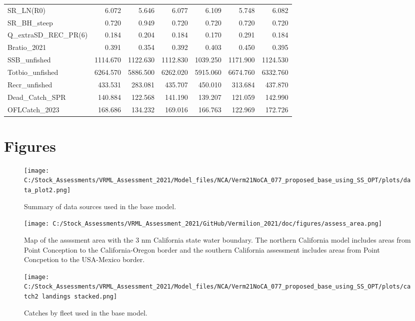 \documentclass[
  english,
  a4paper,
]{article}
\begin{document}
\begin{table}
{\begin{tabular}[t]{lrrrrrr}
SR\_LN(R0) & 6.072 & 5.646 & 6.077 & 6.109 & 5.748 & 6.082\\
SR\_BH\_steep & 0.720 & 0.949 & 0.720 & 0.720 & 0.720 & 0.720\\
Q\_extraSD\_REC\_PR(6) & 0.184 & 0.204 & 0.184 & 0.170 & 0.291 & 0.184\\
Bratio\_2021 & 0.391 & 0.354 & 0.392 & 0.403 & 0.450 & 0.395\\
SSB\_unfished & 1114.670 & 1122.630 & 1112.830 & 1039.250 & 1171.900 & 1124.530\\
Totbio\_unfished & 6264.570 & 5886.500 & 6262.020 & 5915.060 & 6674.760 & 6332.760\\
Recr\_unfished & 433.531 & 283.081 & 435.707 & 450.010 & 313.684 & 437.870\\
Dead\_Catch\_SPR & 140.884 & 122.568 & 141.190 & 139.207 & 121.059 & 142.990\\
OFLCatch\_2023 & 168.686 & 134.232 & 169.016 & 166.763 & 122.969 & 172.726\\
\bottomrule
\end{tabular}}
\end{table}

\clearpage

\hypertarget{figures}{%
\section{Figures}\label{figures}}

\begin{figure}
\centering
\texttt{[image: C:/Stock\_Assessments/VRML\_Assessment\_2021/Model\_files/NCA/Verm21NoCA\_077\_proposed\_base\_using\_SS\_OPT/plots/data\_plot2.png]}
\caption{Summary of data sources used in the base model.\label{fig:data-plot}}
\end{figure}

\begin{figure}
\centering
\texttt{[image: C:/Stock\_Assessments/VRML\_Assessment\_2021/GitHub/Vermilion\_2021/doc/figures/assess\_area.png]}
\caption{Map of the assssment area with the 3 nm California state water boundary. The northern California model includes areas from Point Conception to the California-Oregon border and the southern California assessment includes areas from Point Concpetion to the USA-Mexico border.\label{fig:assess-area}}
\end{figure}

\begin{figure}
\centering
\texttt{[image: C:/Stock\_Assessments/VRML\_Assessment\_2021/Model\_files/NCA/Verm21NoCA\_077\_proposed\_base\_using\_SS\_OPT/plots/catch2 landings stacked.png]}
\caption{Catches by fleet used in the base model.\label{fig:catch}}
\end{figure}
\end{document}
